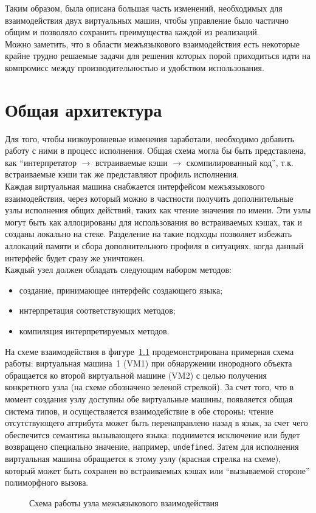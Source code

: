 \documentclass[times,specification,annotation]{itmo-student-thesis}
\begin{document}
\chapterconclusion
Таким образом, была описана большая часть изменений, необходимых для взаимодействия двух виртуальных машин, чтобы управление было частично общим и позволяло сохранить преимущества каждой из реализаций.\\
Можно заметить, что в области межъязыкового взаимодействия есть некоторые крайне трудно решаемые задачи для решения которых порой приходиться идти на компромисс между производительностью и удобством использования.

\chapter{Общая архитектура}\label{ch:architecture}
Для того, чтобы низкоуровневые изменения заработали, необходимо добавить работу с ними в процесс исполнения. Общая схема могла бы быть представлена, как ``интерпретатор $\rightarrow$ встраиваемые кэши $\rightarrow$ скомпилированный код'', т.к. встраиваемые кэши так же представляют профиль исполнения.\\
Каждая виртуальная машина снабжается интерфейсом межъязыкового взаимодействия, через который можно в частности получить дополнительные узлы исполнения общих действий, таких как чтение значения по имени. Эти узлы могут быть как аллоцированы для использования во встраиваемых кэшах, так и созданы локально на стеке. Разделение на такие подходы позволяет избежать аллокаций памяти и сбора дополнительного профиля в ситуациях, когда данный интерфейс будет сразу же уничтожен.\\
Каждый узел должен обладать следующим набором методов:
\begin{itemize}
	\item создание, принимающее интерфейс создающего языка;
	\item интерпретация соответствующих методов;
	\item компиляция интерпретируемых методов.
\end{itemize}
На схеме взаимодействия в фигуре~\ref{fig:create-interop-node} продемонстрирована примерная схема работы: виртуальная машина~1 (VM1) при обнаружении инородного объекта обращается ко второй виртуальной машине (VM2) с целью получения конкретного узла (на схеме обозначено зеленой стрелкой). За счет того, что в момент создания узлу доступны обе виртуальные машины, появляется общая система типов, и осуществляется взаимодействие в обе стороны: чтение отсутствующего аттрибута может быть перенаправлено назад в язык, за счет чего обеспечится семантика вызывающего языка: поднимется исключение или будет возвращено специально значение, например, \texttt{undefined}. Затем для исполнения виртуальная машина обращается к этому узлу (красная стрелка на схеме), который может быть сохранен во встраиваемых кэшах или ``вызываемой стороне'' полиморфного вызова.
\begin{figure}[!h]
	\caption{Схема работы узла межъязыкового взаимодействия}\label{fig:create-interop-node}
	\centering
	
\end{figure}
\end{document}
